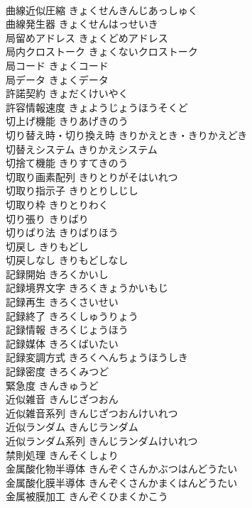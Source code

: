\documentclass[8pt]{extreport}
\begin{document}
\begin{CJK}{UTF8}{min}
\\	曲線近似圧縮	きょくせんきんじあっしゅく	
\\	曲線発生器	きょくせんはっせいき	
\\	局留めアドレス	きょくどめアドレス	
\\	局内クロストーク	きょくないクロストーク	
\\	局コード	きょくコード	
\\	局データ	きょくデータ	
\\	許諾契約	きょだくけいやく	
\\	許容情報速度	きょようじょうほうそくど	
\\	切上げ機能	きりあげきのう	
\\	切り替え時・切り換え時	きりかえとき・きりかえどき	
\\	切替えシステム	きりかえシステム	
\\	切捨て機能	きりすてきのう	
\\	切取り画素配列	きりとりがそはいれつ	
\\	切取り指示子	きりとりしじし	
\\	切取り枠	きりとりわく	
\\	切り張り	きりばり	
\\	切りばり法	きりばりほう	
\\	切戻し	きりもどし	
\\	切戻しなし	きりもどしなし	
\\	記録開始	きろくかいし	
\\	記録境界文字	きろくきょうかいもじ	
\\	記録再生	きろくさいせい	
\\	記録終了	きろくしゅうりょう	
\\	記録情報	きろくじょうほう	
\\	記録媒体	きろくばいたい	
\\	記録変調方式	きろくへんちょうほうしき	
\\	記録密度	きろくみつど	
\\	緊急度	きんきゅうど	
\\	近似雑音	きんじざつおん	
\\	近似雑音系列	きんじざつおんけいれつ	
\\	近似ランダム	きんじランダム	
\\	近似ランダム系列	きんじランダムけいれつ	
\\	禁則処理	きんそくしょり	
\\	金属酸化物半導体	きんぞくさんかぶつはんどうたい	
\\	金属酸化膜半導体	きんぞくさんかまくはんどうたい	
\\	金属被膜加工	きんぞくひまくかこう	

\end{CJK}
\end{document}
